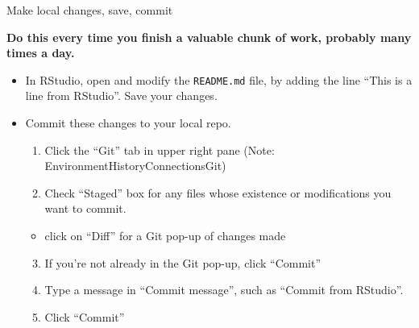 \documentclass[
  ignorenonframetext,
]{beamer}
\providecommand{\tightlist}{%
  \setlength{\itemsep}{0pt}\setlength{\parskip}{0pt}}
\begin{document}
\begin{frame}[fragile]{Make local changes, save, commit}
\protect\hypertarget{make-local-changes-save-commit}{}

\textbf{Do this every time you finish a valuable chunk of work, probably
many times a day.}

\begin{itemize}
\item
  In RStudio, open and modify the \texttt{README.md} file, by adding the
  line ``This is a line from RStudio''. Save your changes.
\item
  Commit these changes to your local repo.

  \begin{enumerate}
  \tightlist
  \item
    Click the ``Git'' tab in upper right pane (Note:
    Environment\textbar{}History\textbar{}Connections\textbar{}Git)
  \item
    Check ``Staged'' box for any files whose existence or modifications
    you want to commit.
  \end{enumerate}

  \begin{itemize}
  \tightlist
  \item
    click on ``Diff'' for a Git pop-up of changes made
  \end{itemize}

  \begin{enumerate}
  \setcounter{enumi}{2}
  \tightlist
  \item
    If you're not already in the Git pop-up, click ``Commit''
  \item
    Type a message in ``Commit message'', such as ``Commit from
    RStudio''.
  \item
    Click ``Commit''
  \end{enumerate}
\end{itemize}

\end{frame}
\end{document}
